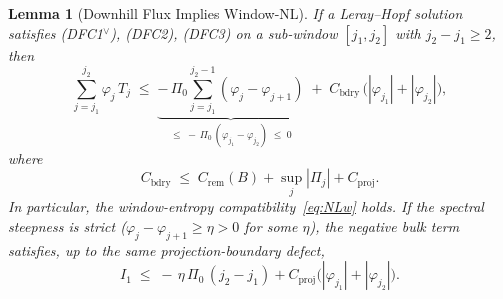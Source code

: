 \documentclass[12pt,a4paper]{article}
\theoremstyle{breakdef}
\theoremstyle{breakplain}
\newtheorem{lemma}[definition]{Lemma}
\theoremstyle{breakdef}
\begin{document}
\begin{lemma}[Downhill Flux Implies Window-NL]\label{lem:DFC-implies-NLw}
If a Leray--Hopf solution satisfies \textup{(DFC1$^\vee$), (DFC2), (DFC3)}
on a
sub-window $[j_1, j_2]$ with $j_2 - j_1 \ge 2$, then
\begin{equation}\label{eq:DFC-quantitative}
  \sum_{j=j_1}^{j_2} \varphi_j\,T_j
  \;\le\;
  \underbrace{-\,\Pi_0
    \sum_{j=j_1}^{j_2-1}(\varphi_j - \varphi_{j+1})}_{\le\;
    -\,\Pi_0\,(\varphi_{j_1}-\varphi_{j_2})\;\le\; 0}
  \;+\;
  C_{\mathrm{bdry}}\,
  \bigl(|\varphi_{j_1}| + |\varphi_{j_2}|\bigr),
\end{equation}
where
\[
  C_{\mathrm{bdry}}
  \;\le\;
  C_{\mathrm{rem}}(B)+\sup_j|\Pi_j|+C_{\mathrm{proj}}.
\]
In particular,
the window-entropy compatibility~\eqref{eq:NLw} holds. If the
spectral steepness is strict ($\varphi_j - \varphi_{j+1} \ge \eta > 0$
for some $\eta$), the negative bulk term satisfies, up to the same
projection-boundary defect,
\begin{equation}\label{eq:bulk-strict}
  I_1 \;\le\; -\,\eta\,\Pi_0\,(j_2 - j_1)
  + C_{\mathrm{proj}}\bigl(|\varphi_{j_1}|+|\varphi_{j_2}|\bigr).
\end{equation}
\end{lemma}
\end{document}
